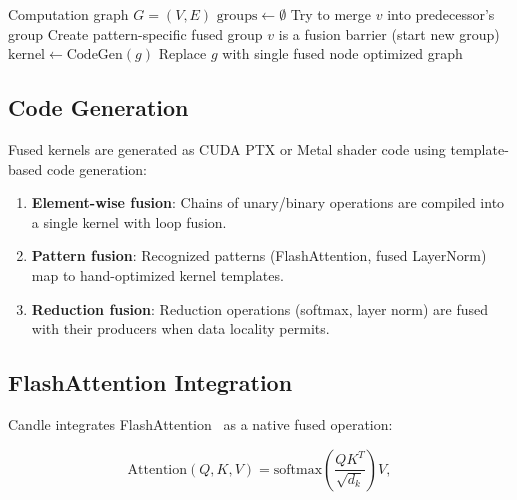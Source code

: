 \begin{algorithm}[H]
\caption{Kernel Fusion Pass}
\label{alg:fusion}
\begin{algorithmic}[1]
\Require Computation graph $G = (V, E)$
\State $\text{groups} \gets \emptyset$
\State {}
        \State Try to merge $v$ into predecessor's group
        \State Create pattern-specific fused group
    \Else
        \State $v$ is a fusion barrier (start new group)
    \EndIf
\EndFor
\State {}
        \State $\text{kernel} \gets \text{CodeGen}(g)$ 
        \State Replace $g$ with single fused node
    \EndIf
\EndFor
\State \Return optimized graph
\end{algorithmic}
\end{algorithm}

\subsection{Code Generation}

Fused kernels are generated as CUDA PTX or Metal shader code using template-based code generation:

\begin{enumerate}[leftmargin=1.4em]
    \item \textbf{Element-wise fusion}: Chains of unary/binary operations are compiled into a single kernel with loop fusion.
    \item \textbf{Pattern fusion}: Recognized patterns (FlashAttention, fused LayerNorm) map to hand-optimized kernel templates.
    \item \textbf{Reduction fusion}: Reduction operations (softmax, layer norm) are fused with their producers when data locality permits.
\end{enumerate}

\subsection{FlashAttention Integration}

Candle integrates FlashAttention~\cite{dao2022flashattention,dao2023flashattention2} as a native fused operation:

\begin{equation}
\text{Attention}(Q, K, V) = \text{softmax}\left(\frac{QK^T}{\sqrt{d_k}}\right)V,
\end{equation}

